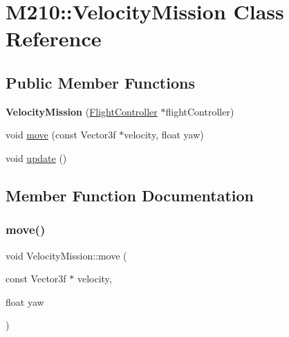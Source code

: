 \hypertarget{class_m210_1_1_velocity_mission}{}\section{M210\+:\+:Velocity\+Mission Class Reference}
\label{class_m210_1_1_velocity_mission}
\subsection*{Public Member Functions}
\begin{DoxyCompactItemize}
\item 
\mbox{\label{class_m210_1_1_velocity_mission_aebd12135407bb5c9487ec1a5d9ec3966}} 
{\bfseries Velocity\+Mission} (\mbox{\hyperlink{class_m210_1_1_flight_controller}{Flight\+Controller}} $\ast$flight\+Controller)
\item 
void \mbox{\hyperlink{class_m210_1_1_velocity_mission_a35a436e3ae0c48014334ccd5d2868861}{move}} (const Vector3f $\ast$velocity, float yaw)
\item 
void \mbox{\hyperlink{class_m210_1_1_velocity_mission_a709e74d4c01378c7cd2bcbab602bba2c}{update}} ()
\end{DoxyCompactItemize}


\subsection{Member Function Documentation}
\mbox{\label{class_m210_1_1_velocity_mission_a35a436e3ae0c48014334ccd5d2868861}} 
\subsubsection{\texorpdfstring{move()}{move()}}
{\footnotesize\ttfamily void Velocity\+Mission\+::move (\begin{DoxyParamCaption}\item[{const Vector3f $\ast$}]{velocity,  }\item[{float}]{yaw }\end{DoxyParamCaption})}

